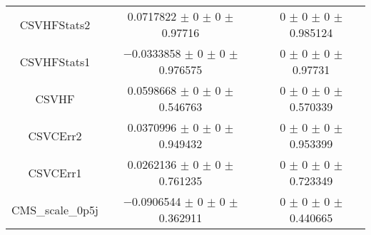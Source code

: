 \begin{table}
\begin{tabular}{ccc}
CSVHFStats2 	& \num{0.0717822} $\pm$ \num{0} $\pm$ \num{0} $\pm$ \num{0.97716} 	& \num{0} $\pm$ \num{0} $\pm$ \num{0} $\pm$ \num{0.985124}\\
CSVHFStats1 	& \num{-0.0333858} $\pm$ \num{0} $\pm$ \num{0} $\pm$ \num{0.976575} 	& \num{0} $\pm$ \num{0} $\pm$ \num{0} $\pm$ \num{0.97731}\\
CSVHF 	& \num{0.0598668} $\pm$ \num{0} $\pm$ \num{0} $\pm$ \num{0.546763} 	& \num{0} $\pm$ \num{0} $\pm$ \num{0} $\pm$ \num{0.570339}\\
CSVCErr2 	& \num{0.0370996} $\pm$ \num{0} $\pm$ \num{0} $\pm$ \num{0.949432} 	& \num{0} $\pm$ \num{0} $\pm$ \num{0} $\pm$ \num{0.953399}\\
CSVCErr1 	& \num{0.0262136} $\pm$ \num{0} $\pm$ \num{0} $\pm$ \num{0.761235} 	& \num{0} $\pm$ \num{0} $\pm$ \num{0} $\pm$ \num{0.723349}\\
CMS\_scale\_0p5j 	& \num{-0.0906544} $\pm$ \num{0} $\pm$ \num{0} $\pm$ \num{0.362911} 	& \num{0} $\pm$ \num{0} $\pm$ \num{0} $\pm$ \num{0.440665}\\
\bottomrule
\end{tabular}
\end{table}